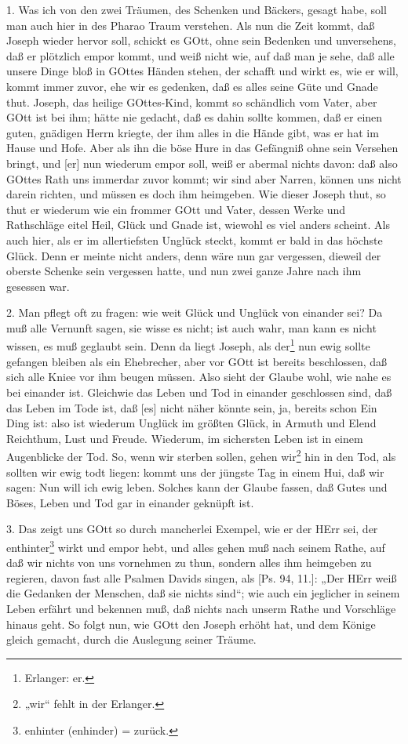 1. Was ich von den zwei Träumen, des Schenken und Bäckers, gesagt habe, soll man auch hier in des Pharao Traum verstehen. Als nun die Zeit kommt, daß Joseph wieder hervor soll, schickt es GOtt, ohne sein Bedenken und unversehens, daß er plötzlich empor kommt, und weiß nicht wie, auf daß man je sehe, daß alle unsere Dinge bloß in GOttes Händen stehen, der schafft und wirkt es, wie er will, kommt immer zuvor, ehe wir es gedenken, daß es alles seine Güte und Gnade thut. Joseph, das heilige GOttes-Kind, kommt so schändlich vom Vater, aber GOtt ist bei ihm; hätte nie gedacht, daß es dahin sollte kommen, daß er einen guten, gnädigen Herrn kriegte, der ihm alles in die Hände gibt, was er hat im Hause und Hofe. Aber als ihn die böse Hure in das Gefängniß ohne sein Versehen bringt, und [er] nun wiederum empor soll, weiß er abermal nichts davon: daß also GOttes Rath uns immerdar zuvor kommt; wir sind aber Narren, können uns nicht darein richten, und müssen es doch ihm heimgeben. Wie dieser Joseph thut, so thut er wiederum wie ein frommer GOtt und Vater, dessen Werke und Rathschläge eitel Heil, Glück und Gnade ist, wiewohl es viel anders scheint. Als auch hier, als er im allertiefsten Unglück steckt, kommt er bald in das höchste Glück. Denn er meinte nicht anders, denn wäre nun gar vergessen, dieweil der oberste Schenke sein vergessen hatte, und nun zwei ganze Jahre nach ihm gesessen war.

2. Man pflegt oft zu fragen: wie weit Glück und Unglück von einander sei? Da muß alle Vernunft sagen, sie wisse es nicht; ist auch wahr, man kann es nicht wissen, es muß geglaubt sein. Denn da liegt Joseph, als der\footnote{Erlanger: er.} nun ewig sollte gefangen bleiben als ein Ehebrecher, aber vor GOtt ist bereits beschlossen, daß sich alle Kniee vor ihm beugen müssen. Also sieht der Glaube wohl, wie nahe es bei einander ist. Gleichwie das Leben und Tod in einander geschlossen sind, daß das Leben im Tode ist, daß [es] nicht näher könnte sein, ja, bereits schon Ein Ding ist: also ist wiederum Unglück im größten Glück, in Armuth und Elend Reichthum, Lust und Freude. Wiederum, im sichersten Leben ist in einem Augenblicke der Tod. So, wenn wir sterben sollen, gehen wir\footnote{„wir“ fehlt in der Erlanger.} hin in den Tod, als sollten wir ewig todt liegen: kommt uns der jüngste Tag in einem Hui, daß wir sagen: Nun will ich ewig leben. Solches kann der Glaube fassen, daß Gutes und Böses, Leben und Tod gar in einander geknüpft ist.

3. Das zeigt uns GOtt so durch mancherlei Exempel, wie er der HErr sei, der enthinter\footnote{enhinter (enhinder) = zurück.} wirkt und empor hebt, und alles gehen muß nach seinem Rathe, auf daß wir nichts von uns vornehmen zu thun, sondern alles ihm heimgeben zu regieren, davon fast alle Psalmen Davids singen, als [Ps. 94, 11.]: „Der HErr weiß die Gedanken der Menschen, daß sie nichts sind“; wie auch ein jeglicher in seinem Leben erfährt
und bekennen muß, daß nichts nach unserm Rathe und Vorschläge hinaus geht. So folgt nun, wie GOtt den Joseph erhöht hat, und dem Könige gleich gemacht, durch die Auslegung seiner Träume.

